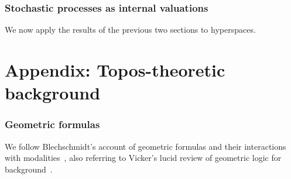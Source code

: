 \documentclass[reqno,11pt]{amsproc}
\theoremstyle{plain}
\theoremstyle{definition}
\numberwithin{equation}{section}
\begin{document}
\section{Stochastic processes as internal valuations}

We now apply the results of the previous two sections to hyperspaces.



\appendix
\part{Appendix: Topos-theoretic background}\label{sec.topos_background}

\section{Geometric formulas}

We follow Blechschmidt's account of geometric formulas and their interactions with modalities~\cite[Chapter~2~and~6]{blechschmidt2017internal}, also referring to Vicker's lucid review of geometric logic for background~\cite{vickers_geometric_logic}.

\clearpage



\end{document}
